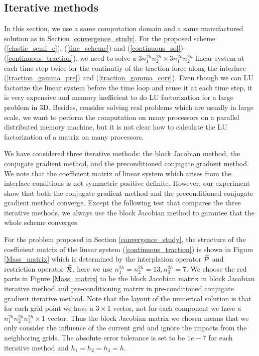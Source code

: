 \subsection{Iterative methods}\label{iterative_section}
In this section, we use a same computation domain and a same manufactured solution as in Section \ref{convergence_study}. For the proposed scheme (\ref{elastic_semi_c}), (\ref{fine_scheme}) and (\ref{continuous_sol})--(\ref{continuous_traction}), we need to solve a $3n_1^{2h}n_2^{2h}\times 3n_1^{2h}n_2^{2h}$ linear system at each time step twice for the continutiy of the traction force along the interface (\ref{traction_gamma_pre}) and (\ref{traction_gamma_corr}). Even though we can LU factorize the linear system before the time loop and reuse it at each time step, it is very expensive and memory inefficient to do LU factorization for a large problem in $3$D. Besides, consider solving real problems which are usually in large scale, we want to perform the computation on many processors on a parallel distributed memory machine, but it is not clear how to calculate the LU factorization of a matrix on many processors. 

We have considered three iterative methods: the block Jacobian method, the conjugate gradient method, and the preconditioned conjugate gradient method. We note that the coefficient matrix of linear system which arises from the interface conditions is not symmetric positive definite. However, our experiment show that both the conjugate gradient method and the preconditioned conjugate gradient method converge. Except the following test that compares the three iterative methods, we always use the block Jacobian method to garantee that the whole scheme converges. 

For the problem proposed in Section \ref{convergence_study}, the structure of the coefficient matrix of the linear system (\ref{continuous_traction}) is shown in Figure \ref{Mass_matrix} which is determined by the interplation operator $\widetilde{\mathcal{P}}$ and restriction operator $\widetilde{\mathcal{R}}$, here we use $n_1^{2h} = n_2^{2h}=13, n_3^{2h} = 7$. We choose the red parts in Figure \ref{Mass_matrix} to be the block Jacobian matrix in block Jacobian iterative method and pre-conditioning matrix in pre-conditioned conjugate gradient iterative method. Note that the layout of the numerical solution is that for each grid point we have a $3\times1$ vector, not for each component we have a $n_1^{2h}n_2^{2h}n_3^{2h}\times1$ vector.  Thus the block Jacobian matrix we chosen means that we only consider the influence of the current grid and ignore the impacts from the neighboring grids. The absolute error tolerance is set to be $1e-7$ for each iterative method and $h_1 = h_2 = h_3 = h$.

